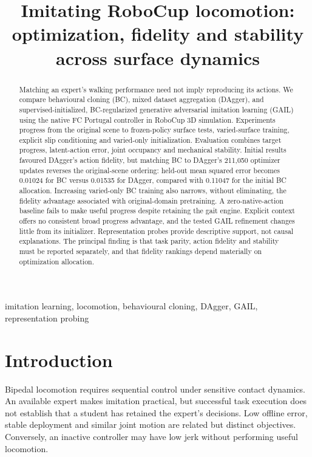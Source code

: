 \documentclass[conference]{IEEEtran}
\title{Imitating RoboCup locomotion: optimization, fidelity and stability across surface dynamics}
\author{\IEEEauthorblockN{Author name to be supplied}
\IEEEauthorblockA{Department and institution to be supplied\\
City, Country\\
Email or ORCID to be supplied}}
\begin{document}
\maketitle


\begin{abstract}

Matching an expert's walking performance need not imply reproducing its actions. We compare behavioural cloning (BC), mixed dataset aggregation (DAgger), and supervised-initialized, BC-regularized generative adversarial imitation learning (GAIL) using the native FC Portugal controller in RoboCup 3D simulation. Experiments progress from the original scene to frozen-policy surface tests, varied-surface training, explicit slip conditioning and varied-only initialization. Evaluation combines target progress, latent-action error, joint occupancy and mechanical stability. Initial results favoured DAgger's action fidelity, but matching BC to DAgger's 211,050 optimizer updates reverses the original-scene ordering: held-out mean squared error becomes 0.01024 for BC versus 0.01535 for DAgger, compared with 0.11047 for the initial BC allocation. Increasing varied-only BC training also narrows, without eliminating, the fidelity advantage associated with original-domain pretraining. A zero-native-action baseline fails to make useful progress despite retaining the gait engine. Explicit context offers no consistent broad progress advantage, and the tested GAIL refinement changes little from its initializer. Representation probes provide descriptive support, not causal explanations. The principal finding is that task parity, action fidelity and stability must be reported separately, and that fidelity rankings depend materially on optimization allocation.

\end{abstract}
\begin{IEEEkeywords}
imitation learning, locomotion, behavioural cloning, DAgger, GAIL, representation probing
\end{IEEEkeywords}

\section{Introduction}

Bipedal locomotion requires sequential control under sensitive contact dynamics. An available expert makes imitation practical, but successful task execution does not establish that a student has retained the expert's decisions. Low offline error, stable deployment and similar joint motion are related but distinct objectives. Conversely, an inactive controller may have low jerk without performing useful locomotion.
\end{document}
